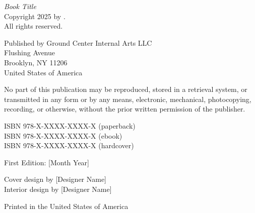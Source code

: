 \documentclass[a5paper,11pt]{book}
\begin{document}
\makeatletter %
{\footnotesize
\setlength{\parindent}{0pt} %
\noindent\textit{Book Title}\\ %
\noindent Copyright \textcopyright{} 2025 by \@author.\\
\noindent All rights reserved.

\vspace{1em}

\noindent Published by Ground Center Internal Arts LLC\\
 Flushing Avenue\\
\noindent Brooklyn, NY 11206\\
\noindent United States of America

\vspace{1em}

\noindent No part of this publication may be reproduced, stored in a retrieval system, or transmitted in any form or by any means, electronic, mechanical, photocopying, recording, or otherwise, without the prior written permission of the publisher.

\vspace{1em}

\noindent ISBN 978-X-XXXX-XXXX-X (paperback)\\ %
\noindent ISBN 978-X-XXXX-XXXX-X (ebook)\\ %
\noindent ISBN 978-X-XXXX-XXXX-X (hardcover) %

\vspace{1em}

\noindent First Edition: [Month Year] %

\vspace{1em}

\noindent Cover design by [Designer Name]\\ %
\noindent Interior design by [Designer Name] %

\vspace{1em}

\noindent Printed in the United States of America %
}
\makeatother %

\end{document}
